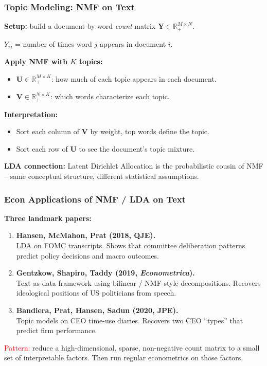 \documentclass[notes,11pt, aspectratio=169]{beamer}
\newcommand{\vU}{\mathbf{U}}
\newcommand{\vV}{\mathbf{V}}
\newcommand{\vY}{\mathbf{Y}}
\newcommand{\R}{\mathbb{R}}
\begin{document}
\begin{frame}
\frametitle{Topic Modeling: NMF on Text}

\textbf{Setup:} build a document-by-word \emph{count} matrix $\vY \in \R_+^{M \times N}$.

\vspace{4pt}
$Y_{ij}$ = number of times word $j$ appears in document $i$.

\vspace{8pt}
\textbf{Apply NMF with $K$ topics:}
\begin{itemize}
    \item $\vU \in \R_{+}^{M \times K}$: how much of each topic appears in each document.
    \item $\vV \in \R_{+}^{N \times K}$: which words characterize each topic.
\end{itemize}

\vspace{8pt}
\textbf{Interpretation:}
\begin{itemize}
    \item Sort each column of $\vV$ by weight, top words define the topic.
    \item Sort each row of $\vU$ to see the document's topic mixture.
\end{itemize}

\vspace{6pt}
\textbf{LDA connection:} Latent Dirichlet Allocation is the probabilistic cousin of NMF -- same conceptual structure, different statistical assumptions.
\end{frame}

\begin{frame}
\frametitle{Econ Applications of NMF / LDA on Text}

\textbf{Three landmark papers:}

\vspace{6pt}
\begin{enumerate}
    \item \textbf{Hansen, McMahon, Prat (2018, QJE).}\\
    LDA on FOMC transcripts. Shows that committee deliberation patterns predict policy decisions and macro outcomes.

    \vspace{6pt}
    \item \textbf{Gentzkow, Shapiro, Taddy (2019, \emph{Econometrica}).}\\
    Text-as-data framework using bilinear / NMF-style decompositions. Recovers ideological positions of US politicians from speech.

    \vspace{6pt}
    \item \textbf{Bandiera, Prat, Hansen, Sadun (2020, JPE).}\\
    Topic models on CEO time-use diaries. Recovers two CEO ``types'' that predict firm performance.
\end{enumerate}

\vspace{8pt}
\textcolor{red}{Pattern:} reduce a high-dimensional, sparse, non-negative count matrix to a small set of interpretable factors. Then run regular econometrics on those factors.
\end{frame}
\end{document}

